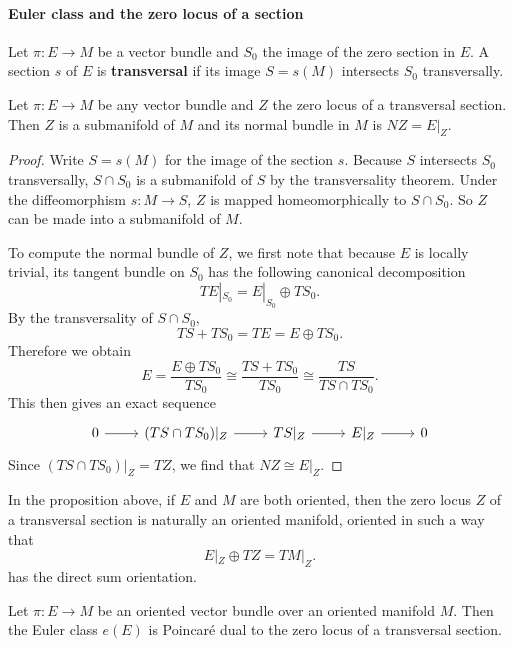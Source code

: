 \paragraph{Euler class and the zero locus of a section}
Let $\pi:E\to M$ be a vector bundle and $S_0$ the image of the zero section in $E$. A section $s$ of $E$ is \textbf{transversal} if its image $S=s(M)$ intersects $S_0$ 
transversally.
\begin{proposition}\label{tran section normal bundle zero locus}
Let $\pi:E\to M$ be any vector bundle and $Z$ the zero locus of a transversal section. Then $Z$ is a submanifold of $M$ and its normal bundle in $M$ is $NZ=E|_Z$.
\end{proposition}
\begin{proof}
Write $S=s(M)$ for the image of the section $s$. Because $S$ intersects $S_0$ transversally, $S\cap S_0$ is a submanifold of $S$ by the transversality theorem. Under 
the diffeomorphism $s:M\to S$, $Z$ is mapped homeomorphically to $S\cap S_0$. So $Z$ can be made into a submanifold of $M$.\par
To compute the normal bundle of $Z$, we first note that because $E$ is locally trivial, its tangent bundle on $S_0$ has the following canonical decomposition
\[TE|_{S_0}=E|_{S_0}\oplus TS_0.\]
By the transversality of $S\cap S_0$,
\[TS+TS_0=TE=E\oplus TS_0.\]
Therefore we obtain
\[E=\frac{E\oplus TS_0}{TS_0}\cong\frac{TS+TS_0}{TS_0}\cong\frac{TS}{TS\cap TS_0}.\]
This then gives an exact sequence
\[\begin{tikzcd}
0\ar[r]&(TS\cap TS_0)|_Z\ar[r]&TS|_Z\ar[r]&E|_Z\ar[r]&0
\end{tikzcd}\]
Since $(TS\cap TS_0)|_Z=TZ$, we find that $NZ\cong E|_Z$.
\end{proof}
In the proposition above, if $E$ and $M$ are both oriented, then the zero locus $Z$ of a transversal section is naturally an oriented manifold, oriented in such a way 
that
\[E|_Z\oplus TZ=TM|_Z.\]
has the direct sum orientation.
\begin{proposition}
Let $\pi:E\to M$ be an oriented vector bundle over an oriented manifold $M$. Then the Euler class $e(E)$ is Poincar\'e dual to the zero locus of a transversal section.
\end{proposition}
